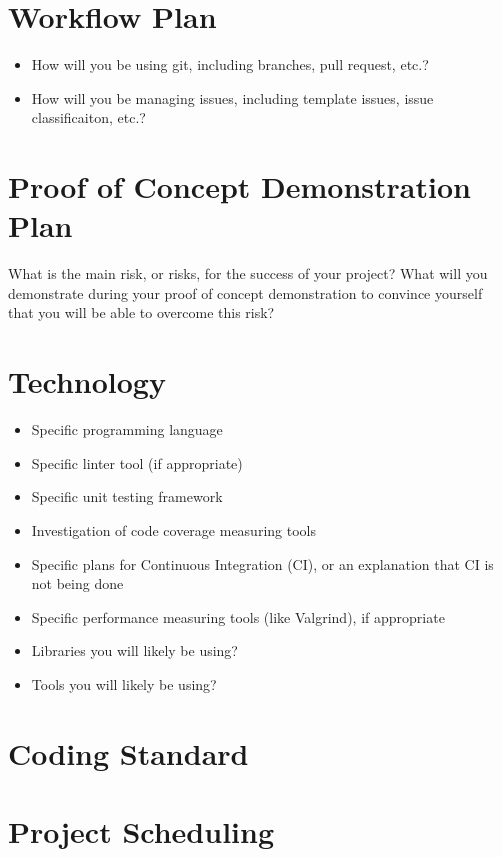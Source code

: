 \documentclass{article}
\begin{document}
\section{Workflow Plan}

\begin{itemize}
	\item How will you be using git, including branches, pull request, etc.?
	\item How will you be managing issues, including template issues, issue
	classificaiton, etc.?
\end{itemize}

\section{Proof of Concept Demonstration Plan}

What is the main risk, or risks, for the success of your project?  What will you
demonstrate during your proof of concept demonstration to convince yourself that
you will be able to overcome this risk?

\section{Technology}

\begin{itemize}
\item Specific programming language
\item Specific linter tool (if appropriate)
\item Specific unit testing framework
\item Investigation of code coverage measuring tools
\item Specific plans for Continuous Integration (CI), or an explanation that CI
  is not being done
\item Specific performance measuring tools (like Valgrind), if
  appropriate
\item Libraries you will likely be using?
\item Tools you will likely be using?
\end{itemize}

\section{Coding Standard}

\section{Project Scheduling}
\end{document}
